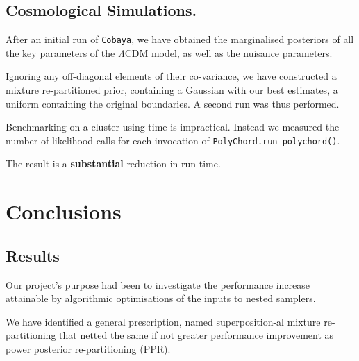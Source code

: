 \documentclass[usenatbib]{mnras}
\begin{document}
\subsection{Cosmological Simulations.}\label{sec:orgb81c159}
After an initial run of \texttt{Cobaya}, we have obtained the marginalised
posteriors of all the key parameters of the \(\Lambda\)CDM model,
as well as the nuisance parameters.

Ignoring any off-diagonal elements of their co-variance, we have
constructed a mixture re-partitioned prior, containing a Gaussian
with our best estimates, a uniform containing the original
boundaries. A second run was thus performed.

Benchmarking on a cluster using time is impractical. Instead we
measured the number of likelihood calls for each invocation of
\texttt{PolyChord.run\_polychord()}.

The result is a \textbf{substantial} reduction in run-time.




\section{Conclusions}\label{sec:orgdf2cbd9}

\subsection{Results}\label{sec:orgc48c55d}
Our project's purpose had been to investigate the performance
increase attainable by algorithmic optimisations of the inputs to
nested samplers.

We have identified a general prescription, named superposition-al
mixture re-partitioning that netted the same if not greater
performance improvement as power posterior re-partitioning (PPR).
\end{document}
